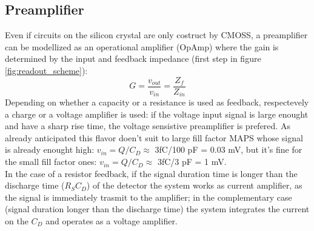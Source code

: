    \subsection{Preamplifier}
      Even if circuits on the silicon crystal are only costruct by CMOSS, a preamplifier can be modellized as an operational amplifier (OpAmp) where the gain is determined by the input and feedback impedance (first step in figure \ref{fig:readout_scheme}):
      \begin{equation}
         G = \frac{v_{out}}{v_{in}} = \frac{Z_{f}}{Z_{in}}
      \end{equation}
      Depending on whether a capacity or a resistance is used as feedback, respectevely a charge or a voltage amplifier is used: if the voltage input signal is large enought and have a sharp rise time, the voltage sensistive preamplifier is prefered. As already anticipated this flavor doen't suit to large fill factor MAPS whose signal is already enought high: $v_{in} = Q/C_{D} \approx$ 3fC/100 pF = 0.03 mV, but it's fine for the small fill factor ones: $v_{in} = Q/C_{D} \approx$ 3fC/3 pF = 1 mV.\\
      In the case of a resistor feedback, if the signal duration time is longer than the discharge time  ($R_S C_D$) of the detector the system works as current amplifier, as the signal is immediately trasmit to the amplifier; in the complementary case (signal duration longer than the discharge time) the system integrates the current on the $C_D$ and operates as a voltage amplifier.\\


